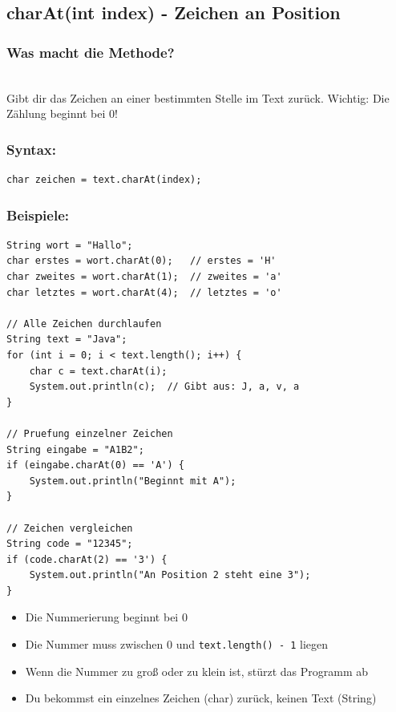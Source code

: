 \newpage


\subsection*{charAt(int index) - Zeichen an Position}

\subsubsection*{Was macht die Methode?}\\
Gibt dir das Zeichen an einer bestimmten Stelle im Text zurück. Wichtig: Die Zählung beginnt bei 0!

\subsubsection*{Syntax:}
\begin{lstlisting}
char zeichen = text.charAt(index);
\end{lstlisting}

\subsubsection*{Beispiele:}
\begin{lstlisting}
String wort = "Hallo";
char erstes = wort.charAt(0);   // erstes = 'H'
char zweites = wort.charAt(1);  // zweites = 'a'
char letztes = wort.charAt(4);  // letztes = 'o'

// Alle Zeichen durchlaufen
String text = "Java";
for (int i = 0; i < text.length(); i++) {
    char c = text.charAt(i);
    System.out.println(c);  // Gibt aus: J, a, v, a
}

// Pruefung einzelner Zeichen
String eingabe = "A1B2";
if (eingabe.charAt(0) == 'A') {
    System.out.println("Beginnt mit A");
}

// Zeichen vergleichen
String code = "12345";
if (code.charAt(2) == '3') {
    System.out.println("An Position 2 steht eine 3");
}
\end{lstlisting}

\begin{achtung}
	\begin{itemize}
		\item Die Nummerierung beginnt bei 0
		\item Die Nummer muss zwischen 0 und \texttt{text.length() - 1} liegen
		\item Wenn die Nummer zu groß oder zu klein ist, stürzt das Programm ab
		\item Du bekommst ein einzelnes Zeichen (char) zurück, keinen Text (String)
	\end{itemize}
\end{achtung}

